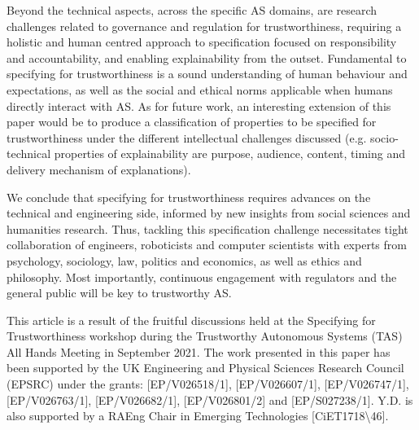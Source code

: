 \documentclass[sigconf,nonacm]{acmart}%
\begin{document}
	Beyond the technical aspects, across the specific AS domains, are research challenges related to governance and regulation for trustworthiness, requiring a holistic and human centred approach to specification focused on responsibility and accountability, and enabling explainability from the outset. 
	Fundamental to specifying for trustworthiness is a sound understanding of human behaviour and expectations, as well as the social and ethical norms applicable when humans directly interact with AS. 
	As for future work, an interesting extension of this paper would be to produce a classification of properties to be specified for trustworthiness under the different intellectual challenges discussed (e.g. socio-technical properties of explainability are purpose, audience, content, timing and delivery mechanism of explanations). 
	
	We conclude that specifying for trustworthiness requires advances on the technical and engineering side, informed by new insights from social sciences and humanities research. Thus, tackling this specification challenge necessitates tight collaboration of engineers, roboticists and computer scientists with experts from psychology, sociology, law, politics and economics, as well as ethics and philosophy. Most importantly, continuous engagement with regulators and the general public will be key to trustworthy AS.
	
	\begin{acks}
		This article is a result of the fruitful discussions held at the Specifying for Trustworthiness workshop during the Trustworthy Autonomous Systems (TAS) All Hands Meeting in September 2021. 
		The work presented in this paper has been supported by the UK Engineering and Physical Sciences Research Council (EPSRC) under the grants: [EP/V026518/1], [EP/V026607/1], [EP/V026747/1], [EP/V026763/1], [EP/V026682/1], [EP/V026801/2] and [EP/S027238/1]. Y.D. is also supported by a RAEng Chair in Emerging Technologies [CiET1718\textbackslash46].
	\end{acks}
	
	
	
	
\end{document}
